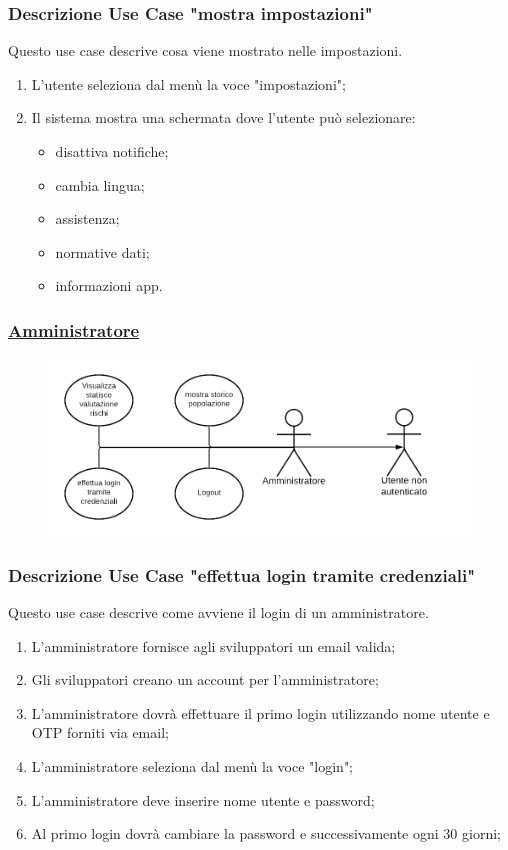 \subsubsection*{Descrizione Use Case "mostra impostazioni"}
Questo use case descrive cosa viene mostrato nelle impostazioni.
\begin{enumerate}
    \item L'utente seleziona dal menù la voce "impostazioni";
    \item Il sistema mostra una schermata dove l'utente può selezionare:
    \begin{itemize}
        \item disattiva notifiche;
        \item cambia lingua;
        \item assistenza;
        \item normative dati;
        \item informazioni app.
    \end{itemize}
\end{enumerate}

\subsubsection*{\underline{\large{Amministratore}}}

\begin{figure}[ht]
    \centering
    \includegraphics[scale=0.4]{Img/Amministratore.png}
\end{figure}

\subsubsection*{Descrizione Use Case "effettua login tramite credenziali"}
Questo use case descrive come avviene il login di un amministratore.
\begin{enumerate}
    \item L'amministratore fornisce agli sviluppatori un email valida;
    \item Gli sviluppatori creano un account per l'amministratore;
    \item L'amministratore dovrà effettuare il primo login utilizzando nome utente e OTP forniti via email;
    \item L'amministratore  seleziona dal menù la voce "login";
    \item L'amministratore deve inserire nome utente e password;
    \item Al primo login dovrà cambiare la password e successivamente ogni 30 giorni;
\end{enumerate}

